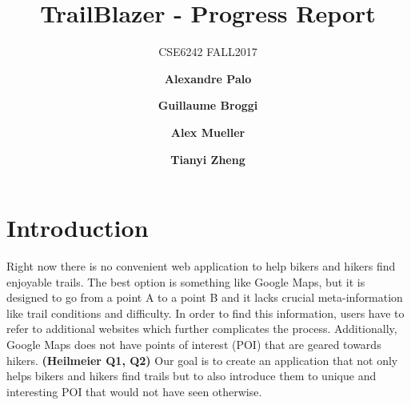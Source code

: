 \documentclass[sigconf]{acmart}
\begin{document}
\title{TrailBlazer - Progress Report}
\subtitle{CSE6242 FALL2017}


\author{\textbf{Alexandre Palo}}

\author{\textbf{Guillaume Broggi}}

\author{\textbf{Alex Mueller}}

\author{\textbf{Tianyi Zheng}}

\maketitle

\section{Introduction}

Right now there is no convenient web application to help bikers and hikers find enjoyable trails. The best option is something like Google Maps, but it is designed to go from a point A to a point B and it lacks crucial meta-information like trail conditions and difficulty. In order to find this information, users have to refer to additional websites which further complicates the process. Additionally, Google Maps does not have points of interest (POI) that are geared towards hikers. \textbf{(Heilmeier Q1, Q2)} Our goal is to create an application that not only helps bikers and hikers find trails but to also introduce them to unique and interesting POI that would not have seen otherwise.
\end{document}
